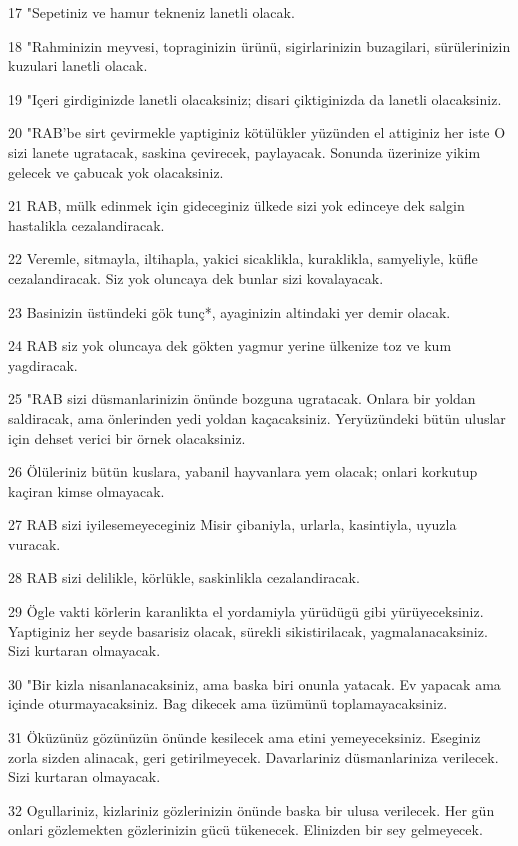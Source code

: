 \par 17 "Sepetiniz ve hamur tekneniz lanetli olacak.
\par 18 "Rahminizin meyvesi, topraginizin ürünü, sigirlarinizin buzagilari, sürülerinizin kuzulari lanetli olacak.
\par 19 "Içeri girdiginizde lanetli olacaksiniz; disari çiktiginizda da lanetli olacaksiniz.
\par 20 "RAB'be sirt çevirmekle yaptiginiz kötülükler yüzünden el attiginiz her iste O sizi lanete ugratacak, saskina çevirecek, paylayacak. Sonunda üzerinize yikim gelecek ve çabucak yok olacaksiniz.
\par 21 RAB, mülk edinmek için gideceginiz ülkede sizi yok edinceye dek salgin hastalikla cezalandiracak.
\par 22 Veremle, sitmayla, iltihapla, yakici sicaklikla, kuraklikla, samyeliyle, küfle cezalandiracak. Siz yok oluncaya dek bunlar sizi kovalayacak.
\par 23 Basinizin üstündeki gök tunç*, ayaginizin altindaki yer demir olacak.
\par 24 RAB siz yok oluncaya dek gökten yagmur yerine ülkenize toz ve kum yagdiracak.
\par 25 "RAB sizi düsmanlarinizin önünde bozguna ugratacak. Onlara bir yoldan saldiracak, ama önlerinden yedi yoldan kaçacaksiniz. Yeryüzündeki bütün uluslar için dehset verici bir örnek olacaksiniz.
\par 26 Ölüleriniz bütün kuslara, yabanil hayvanlara yem olacak; onlari korkutup kaçiran kimse olmayacak.
\par 27 RAB sizi iyilesemeyeceginiz Misir çibaniyla, urlarla, kasintiyla, uyuzla vuracak.
\par 28 RAB sizi delilikle, körlükle, saskinlikla cezalandiracak.
\par 29 Ögle vakti körlerin karanlikta el yordamiyla yürüdügü gibi yürüyeceksiniz. Yaptiginiz her seyde basarisiz olacak, sürekli sikistirilacak, yagmalanacaksiniz. Sizi kurtaran olmayacak.
\par 30 "Bir kizla nisanlanacaksiniz, ama baska biri onunla yatacak. Ev yapacak ama içinde oturmayacaksiniz. Bag dikecek ama üzümünü toplamayacaksiniz.
\par 31 Öküzünüz gözünüzün önünde kesilecek ama etini yemeyeceksiniz. Eseginiz zorla sizden alinacak, geri getirilmeyecek. Davarlariniz düsmanlariniza verilecek. Sizi kurtaran olmayacak.
\par 32 Ogullariniz, kizlariniz gözlerinizin önünde baska bir ulusa verilecek. Her gün onlari gözlemekten gözlerinizin gücü tükenecek. Elinizden bir sey gelmeyecek.
